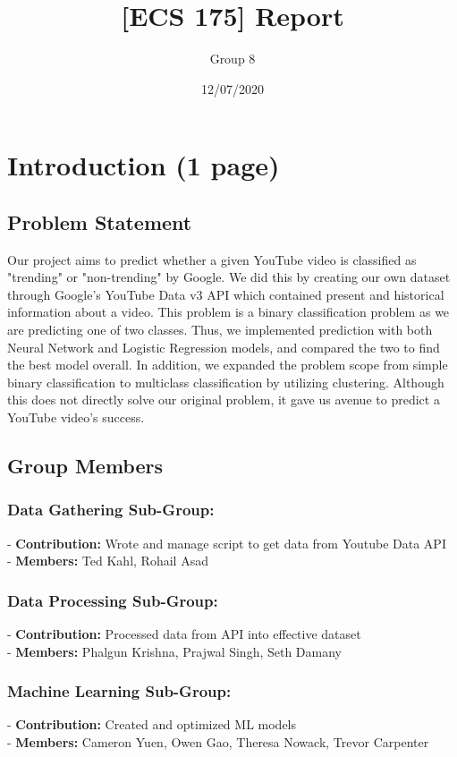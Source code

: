 \documentclass{article}
\title{[ECS 175] Report}
\date{12/07/2020}
\author{Group 8}
\begin{document}
\maketitle

\section*{Introduction (1 page)}
\subsection*{Problem Statement}
\quad Our project aims to predict whether a given YouTube video is classified as "trending" or "non-trending" by Google. We did this by creating our own dataset through Google's YouTube Data v3 API which contained present and historical information about a video. This problem is a binary classification problem as we are predicting one of two classes. Thus, we implemented prediction with both Neural Network and Logistic Regression models, and compared the two to find the best model overall. In addition, we expanded the problem scope from simple binary classification to multiclass classification by utilizing clustering. Although this does not directly solve our original problem, it gave us avenue to predict a YouTube video's success.

\subsection*{Group Members}
\subsubsection*{Data Gathering Sub-Group:}
- \textbf{Contribution:} Wrote and manage script to get data from Youtube Data API \\
- \textbf{Members:} Ted Kahl, Rohail Asad
\subsubsection*{Data Processing Sub-Group:}
- \textbf{Contribution:} Processed data from API into effective dataset \\
- \textbf{Members:} Phalgun Krishna, Prajwal Singh, Seth Damany
\subsubsection*{Machine Learning Sub-Group:}
- \textbf{Contribution:} Created and optimized ML models \\
- \textbf{Members:} Cameron Yuen, Owen Gao, Theresa Nowack, Trevor Carpenter
\end{document}
